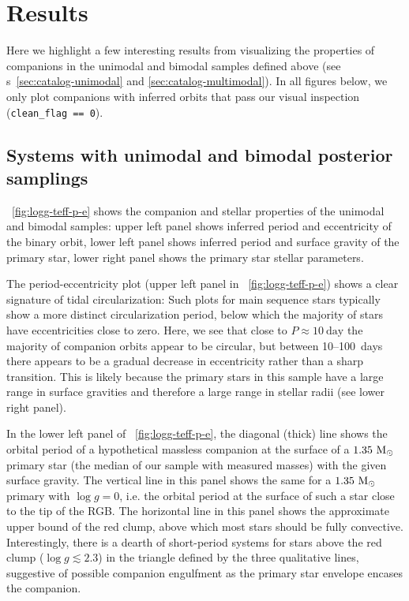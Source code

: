 \documentclass[modern, letterpaper]{aastex62}
\newcommand{\logg}{\ensuremath{\log g}}
\begin{document}


\section{Results}
\label{sec:results}

Here we highlight a few interesting results from visualizing the properties of
companions in the unimodal and bimodal samples defined above (see \sectionname
s~\ref{sec:catalog-unimodal} and \ref{sec:catalog-multimodal}).
In all figures below, we only plot companions with inferred orbits that pass our
visual inspection (\texttt{clean\_flag == 0}).

\subsection{Systems with unimodal and bimodal posterior samplings}

\figurename~\ref{fig:logg-teff-p-e} shows the companion and stellar properties
of the unimodal and bimodal samples: upper left panel shows inferred period and
eccentricity of the binary orbit, lower left panel shows inferred period and
surface gravity of the primary star, lower right panel shows the primary star
stellar parameters.

The period-eccentricity plot (upper left panel in
\figurename~\ref{fig:logg-teff-p-e}) shows a clear signature of tidal
circularization: Such plots for main sequence stars typically show a more
distinct circularization period, below which the majority of stars have
eccentricities close to zero.
Here, we see that close to $P\approx 10~\textrm{day}$ the majority of companion
orbits appear to be circular, but between 10--100~days there appears to be a
gradual decrease in eccentricity rather than a sharp transition.
This is likely because the primary stars in this sample have a large range in
surface gravities and therefore a large range in stellar radii (see lower right
panel).

In the lower left panel of \figurename~\ref{fig:logg-teff-p-e}, the diagonal
(thick) line shows the orbital period of a hypothetical massless companion at
the surface of a $1.35~\mathrm{M}_\odot$ primary star (the median of our sample with
measured masses) with the given surface gravity.
The vertical line in this panel shows the same for a $1.35~\mathrm{M}_\odot$ primary with
$\logg=0$, i.e. the orbital period at the surface of such a star close to the
tip of the RGB.
The horizontal line in this panel shows the approximate upper bound of the red
clump, above which most stars should be fully convective.
Interestingly, there is a dearth of short-period systems for stars above the red
clump ($\logg \lesssim 2.3$) in the triangle defined by the three qualitative
lines, suggestive of possible companion engulfment as the primary star envelope
encases the companion.
\end{document}

